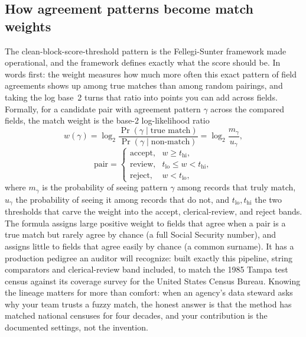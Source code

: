 \documentclass[
    a4paper,
    fontsize=10pt,
    twoside=true,
    numbers=noenddot,
]{kaobook}
\begin{document}
\subsection{How agreement patterns become match weights}\label{sec:ch06-fspedigree}
The clean-block-score-threshold pattern is the Fellegi-Sunter framework made operational, and the framework defines exactly what the score should be. In words first: the weight measures how much more often this exact pattern of field agreements shows up among true matches than among random pairings, and taking the log base~2 turns that ratio into points you can add across fields. Formally, for a candidate pair with agreement pattern $\gamma$ across the compared fields, the match weight is the base-2 log-likelihood ratio
\[
  w(\gamma)=\log_2\frac{\Pr(\gamma\mid\text{true match})}{\Pr(\gamma\mid\text{non-match})}
           =\log_2\frac{m_\gamma}{u_\gamma},
\]
\[
  \text{pair}=\begin{cases}
    \text{accept}, & w \ge t_{\text{hi}},\\
    \text{review}, & t_{\text{lo}} \le w < t_{\text{hi}},\\
    \text{reject}, & w < t_{\text{lo}},
  \end{cases}
\]
where $m_\gamma$ is the probability of seeing pattern $\gamma$ among records that truly match, $u_\gamma$ the probability of seeing it among records that do not, and $t_{\text{lo}},t_{\text{hi}}$ the two thresholds that carve the weight into the accept, clerical-review, and reject bands. The formula assigns large positive weight to fields that agree when a pair is a true match but rarely agree by chance (a full Social Security number), and assigns little to fields that agree easily by chance (a common surname). It has a production pedigree an auditor will recognize: \textcite{jaro1989tampa} built exactly this pipeline, string comparators and clerical-review band included, to match the 1985 Tampa test census against its coverage survey for the United States Census Bureau. Knowing the lineage matters for more than comfort: when an agency's data steward asks why your team trusts a fuzzy match, the honest answer is that the method has matched national censuses for four decades, and your contribution is the documented settings, not the invention.
\end{document}
